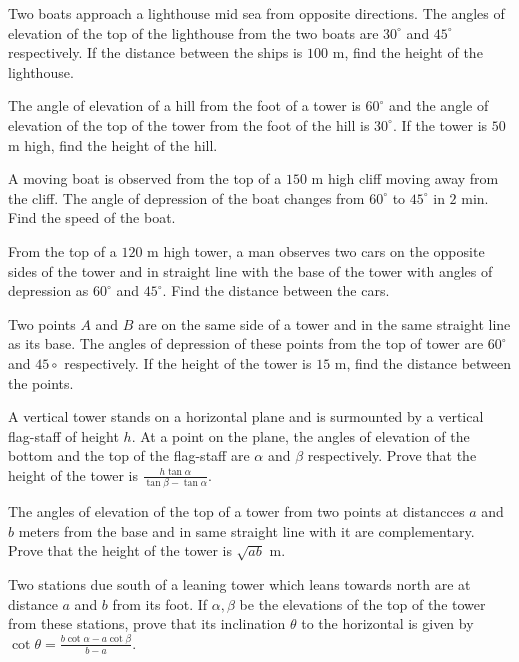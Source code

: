 \item Two boats approach a lighthouse mid sea from opposite directions. The angles of elevation of the top of the lighthouse from
  the two boats are $30^\circ$ and $45^\circ$ respectively. If the distance between the ships is $100$ m, find
  the height of the lighthouse.

\item The angle of elevation of a hill from the foot of a tower is $60^\circ$ and the angle of elevation of the top of the
  tower from the foot of the hill is $30^\circ$. If the tower is $50$ m high, find the height of the hill.

\item A moving boat is observed from the top of a $150$ m high cliff moving away from the cliff. The angle of depression of the
  boat changes from $60^\circ$ to $45^\circ$ in $2$ min. Find the speed of the boat.

\item From the top of a $120$ m high tower, a man observes two cars on the opposite sides of the tower and in straight line
  with the base of the tower with angles of depression as $60^\circ$ and $45^\circ$. Find the distance between the
  cars.

\item Two points $A$ and $B$ are on the same side of a tower and in the same straight line as its base. The angles of
  depression of these points from the top of tower are $60^\circ$ and $45\circ$ respectively. If the height of the
  tower is $15$ m, find the distance between the points.

\item A vertical tower stands on a horizontal plane and is surmounted by a vertical flag-staff of height $h$. At a point on the
  plane, the angles of elevation of the bottom and the top of the flag-staff are $\alpha$ and $\beta$
  respectively. Prove that the height of the tower is $\frac{h\tan\alpha}{\tan\beta - \tan\alpha}$.

\item The angles of elevation of the top of a tower from two points at distancces $a$ and $b$ meters from the base and in
  same straight line with it are complementary. Prove that the height of the tower is $\sqrt{ab}$ m.

\item Two stations due south of a leaning tower which leans towards north are at distance $a$ and $b$ from its foot. If
  $\alpha, \beta$ be the elevations of the top of the tower from these stations, prove that its inclination $\theta$
  to the horizontal is given by $\cot\theta = \frac{b\cot\alpha - a\cot\beta}{b - a}$.

